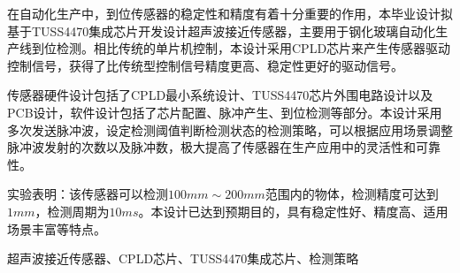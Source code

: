\begin{ZhAbstract}
    在自动化生产中，到位传感器的稳定性和精度有着十分重要的作用，本毕业设计拟基于TUSS4470集成芯片开发设计超声波接近传感器，主要用于钢化玻璃自动化生产线到位检测。相比传统的单片机控制，本设计采用CPLD芯片来产生传感器驱动控制信号，获得了比传统型控制信号精度更高、稳定性更好的驱动信号。\par
    传感器硬件设计包括了CPLD最小系统设计、TUSS4470芯片外围电路设计以及PCB设计，软件设计包括了芯片配置、脉冲产生、到位检测等部分。本设计采用多次发送脉冲波，设定检测阈值判断检测状态的检测策略，可以根据应用场景调整脉冲波发射的次数以及脉冲数，极大提高了传感器在生产应用中的灵活性和可靠性。\par
    实验表明：该传感器可以检测$100mm\sim200mm$范围内的物体，检测精度可达到$1mm$，检测周期为$10ms$。本设计已达到预期目的，具有稳定性好、精度高、适用场景丰富等特点。
    
    \ChineseKeyWord 超声波接近传感器、CPLD芯片、TUSS4470集成芯片、检测策略
    
\end{ZhAbstract}